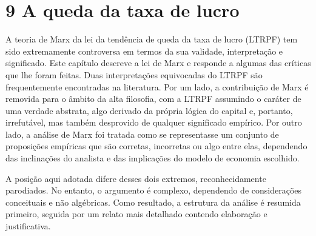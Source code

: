 \chapter{9 A queda da taxa de lucro}\label{9 A queda da taxa de lucro}
 \par 
A teoria de Marx da lei da tendência de queda da taxa de lucro (LTRPF) tem sido extremamente controversa em termos da sua validade, interpretação e significado. Este capítulo descreve a lei de Marx e responde a algumas das críticas que lhe foram feitas. Duas interpretações equivocadas do LTRPF são frequentemente encontradas na literatura. Por um lado, a contribuição de Marx é removida para o âmbito da alta filosofia, com a LTRPF assumindo o caráter de uma verdade abstrata, algo derivado da própria lógica do capital e, portanto, irrefutável, mas também desprovido de qualquer significado empírico. Por outro lado, a análise de Marx foi tratada como se representasse um conjunto de proposições empíricas que são corretas, incorretas ou algo entre elas, dependendo das inclinações do analista e das implicações do modelo de economia escolhido.
 \par 
A posição aqui adotada difere desses dois extremos, reconhecidamente parodiados. No entanto, o argumento é complexo, dependendo de considerações conceituais e não algébricas. Como resultado, a estrutura da análise é resumida primeiro, seguida por um relato mais detalhado contendo elaboração e justificativa.
 \par 
